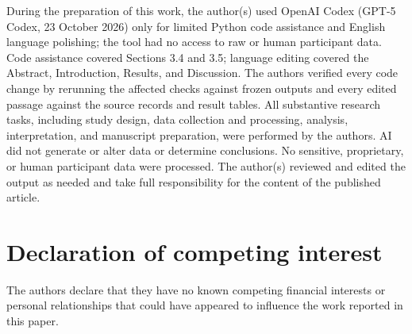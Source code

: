 \documentclass[a4paper,fleqn]{cas-dc}
\begin{document}
During the preparation of this work, the author(s) used OpenAI Codex (GPT-5 Codex, 23 October 2026) only for limited Python code assistance and English language polishing; the tool had no access to raw or human participant data. Code assistance covered Sections 3.4 and 3.5; language editing covered the Abstract, Introduction, Results, and Discussion. The authors verified every code change by rerunning the affected checks against frozen outputs and every edited passage against the source records and result tables. All substantive research tasks, including study design, data collection and processing, analysis, interpretation, and manuscript preparation, were performed by the authors. AI did not generate or alter data or determine conclusions. No sensitive, proprietary, or human participant data were processed. The author(s) reviewed and edited the output as needed and take full responsibility for the content of the published article.

\section*{Declaration of competing interest}

The authors declare that they have no known competing financial interests or personal relationships that could have appeared to influence the work reported in this paper.
\end{document}
